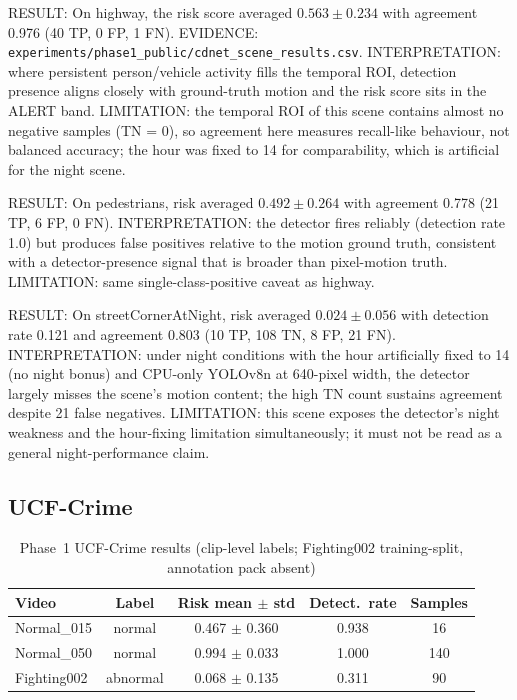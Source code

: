 RESULT: On highway, the risk score averaged $0.563 \pm 0.234$ with agreement 0.976 (40 TP, 0 FP, 1 FN). EVIDENCE: \texttt{experiments/phase1\_public/cdnet\_scene\_results.csv}. INTERPRETATION: where persistent person/vehicle activity fills the temporal ROI, detection presence aligns closely with ground-truth motion and the risk score sits in the ALERT band. LIMITATION: the temporal ROI of this scene contains almost no negative samples (TN = 0), so agreement here measures recall-like behaviour, not balanced accuracy; the hour was fixed to 14 for comparability, which is artificial for the night scene.

RESULT: On pedestrians, risk averaged $0.492 \pm 0.264$ with agreement 0.778 (21 TP, 6 FP, 0 FN). INTERPRETATION: the detector fires reliably (detection rate 1.0) but produces false positives relative to the motion ground truth, consistent with a detector-presence signal that is broader than pixel-motion truth. LIMITATION: same single-class-positive caveat as highway.

RESULT: On streetCornerAtNight, risk averaged $0.024 \pm 0.056$ with detection rate 0.121 and agreement 0.803 (10 TP, 108 TN, 8 FP, 21 FN). INTERPRETATION: under night conditions with the hour artificially fixed to 14 (no night bonus) and CPU-only YOLOv8n at 640-pixel width, the detector largely misses the scene's motion content; the high TN count sustains agreement despite 21 false negatives. LIMITATION: this scene exposes the detector's night weakness and the hour-fixing limitation simultaneously; it must not be read as a general night-performance claim.

\subsection{UCF-Crime}

\begin{table}[H]
\centering
\caption{Phase~1 UCF-Crime results (clip-level labels; Fighting002 training-split, annotation pack absent)}
\label{tab:phase1-ucf}
\begin{tabular}{|l|c|c|c|c|}
\hline
\textbf{Video} & \textbf{Label} & \textbf{Risk mean $\pm$ std} & \textbf{Detect.\ rate} & \textbf{Samples} \\
\hline
Normal\_015 & normal & 0.467 $\pm$ 0.360 & 0.938 & 16 \\
Normal\_050 & normal & 0.994 $\pm$ 0.033 & 1.000 & 140 \\
Fighting002 & abnormal & 0.068 $\pm$ 0.135 & 0.311 & 90 \\
\hline
\end{tabular}
\end{table}

